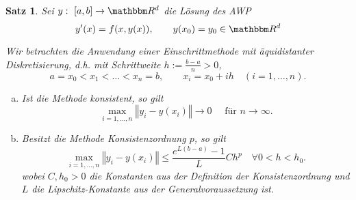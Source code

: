 \documentclass[12pt,a4paper]{book}
\theoremstyle{break}
\newtheorem{theorem}{Satz}[chapter]
\theoremstyle{nonumberplain}
\newcommand{\R}{\mathbbm R}
\newcommand{\norm}[1]{\left\Vert#1\right\Vert}		%
\newcommand{\1}{\mathbbm{1}} 			      	%
\begin{document}
\begin{theorem}\label{satz:konv_Einschritt}
Sei $y:\ [a,b]\to \R^d$ die Lösung des AWP
\[
y'(x)=f(x,y(x)), \qquad y(x_0)=y_0\in \R^d
\]

Wir betrachten die Anwendung einer Einschrittmethode mit
äquidistanter Diskretisierung, d.h. mit Schrittweite $h:=\frac{b-a}{n}>0$,
\[
a=x_0 < x_1 < \ldots < x_n=b, \qquad x_i=x_0+ih \quad (i=1,\ldots,n).
\]
%
\begin{enumerate}[(a)]
\item Ist die Methode konsistent, so gilt
\[
\max_{i=1,\ldots,n} \norm{y_i-y(x_i)}\to 0 \quad \mbox{ für $n\to \infty$}.
\]
%
\item Besitzt die Methode Konsistenzordnung $p$, so gilt
\[
\max_{i=1,\ldots,n} \norm{y_i-y(x_i)}\leq \frac{e^{L(b-a)}-1}{L} C h^p \quad \forall 0<h<h_0.
\]
wobei $C,h_0>0$ die Konstanten aus der Definition der Konsistenzordnung und $L$ die Lipschitz-Konstante
aus der Generalvoraussetzung ist.
\end{enumerate}
\end{theorem}
\end{document}
